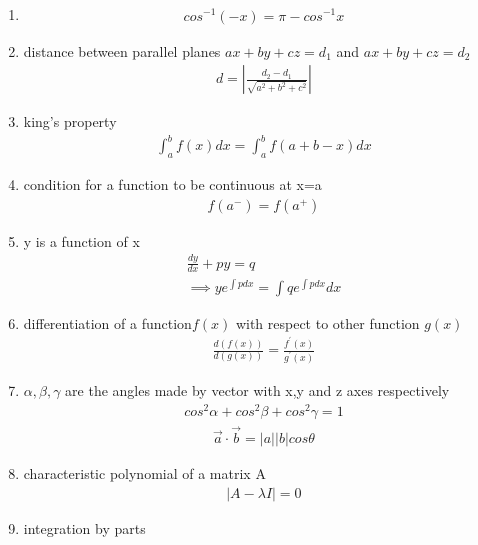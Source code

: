 \begin{enumerate}[label=\thesubsection.\arabic*, ref=\thesubsection.\theenumi]
\item 
\begin{align}
    cos^{-1}(-x)=\pi - cos^{-1}x \label{eq:ee26btech11222-prob 8_2}
\end{align}
 \item distance between parallel planes $ax+by+cz=d_1$ and $ax+by+cz=d_2$
 \begin{align}
     d=\left | \frac{d_2-d_1}{\sqrt{a^2+b^2+c^2}}\right | \label{eq:ee26btech11222-prob 13}
 \end{align}
 \item king's property
 \begin{align}
     \int_a^b f(x)dx= \int_a^b f(a+b-x)dx \label{eq:ee26btech11222-prob 14}
 \end{align}
 \item condition for a function to be continuous at x=a
 \begin{align}
     f(a^-)=f(a^+) \label{eq:ee26btech11222-prob 16}
 \end{align}
 \item y is a function of x
 \begin{align}
     \frac{dy}{dx}+py=q \\ \implies ye^{\int pdx}= \int q  e^{\int pdx}dx \label{eq:ee26btech11222-prob 17}
 \end{align} \newpage 
 \item differentiation of a function$f(x)$ with respect to other function $g(x)$
 \begin{align}
     \frac{d(f(x))}{d(g(x))}=\frac{f^\prime (x)}{g^\prime (x)} \label{eq:ee26btech11222-prob 20}
 \end{align}
 \item $\alpha ,\beta, \gamma $ are the angles made by vector with x,y and z axes respectively 
 \begin{align} 
     cos^2\alpha+ cos^2\beta+cos^2\gamma=1 \label{eq:ee26btech11222-prob 19}
 \end{align}
 \begin{align}
 	\overrightarrow{a}\cdot\overrightarrow{b}=\vert{a}\vert{}\vert{}b\vert{}cos\theta \label{eq:ee26btech11222-prob-19_2}
 \end{align}
 \item characteristic polynomial of a matrix A
 \begin{align}
    |A-\lambda I|=0 \label{eq:ee26btech11222-prob 22} 
 \end{align}
 \item integration by parts 
 \begin{align}

\end{align}
\end{enumerate}
